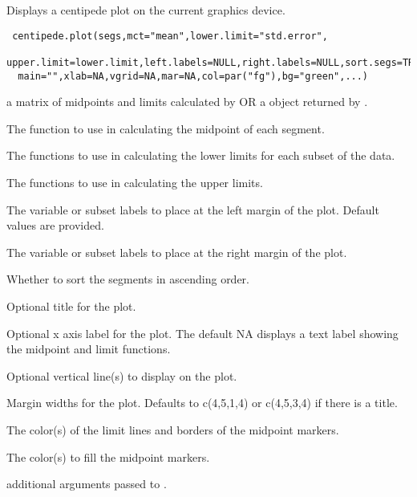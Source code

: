 \begin{Description}\relax
Displays a centipede plot on the current graphics device.
\end{Description}
\begin{Usage}
\begin{verbatim}
 centipede.plot(segs,mct="mean",lower.limit="std.error",
  upper.limit=lower.limit,left.labels=NULL,right.labels=NULL,sort.segs=TRUE,
  main="",xlab=NA,vgrid=NA,mar=NA,col=par("fg"),bg="green",...)
\end{verbatim}
\end{Usage}
\begin{Arguments}
\begin{ldescription}
\item[\code{segs}] a matrix of midpoints and limits calculated by
 OR a  object returned by
.
\item[\code{mct}] The function to use in calculating the midpoint of each
segment.
\item[\code{lower.limit}] The functions to use in calculating the
lower limits for each subset of the data.
\item[\code{upper.limit}] The functions to use in calculating the
upper limits.
\item[\code{left.labels}] The variable or subset labels to place 
at the left margin of the plot. Default values are provided.
\item[\code{right.labels}] The variable or subset labels to place 
at the right margin of the plot.
\item[\code{sort.segs}] Whether to sort the segments in ascending order.
\item[\code{main}] Optional title for the plot.
\item[\code{xlab}] Optional x axis label for the plot. The default NA
displays a text label showing the midpoint and limit functions.
\item[\code{vgrid}] Optional vertical line(s) to display on the plot.
\item[\code{mar}] Margin widths for the plot. Defaults to c(4,5,1,4) or 
c(4,5,3,4) if there is a title.
\item[\code{col}] The color(s) of the limit lines and borders of the midpoint
markers.
\item[\code{bg}] The color(s) to fill the midpoint markers.
\item[\code{...}] additional arguments passed to .
\end{ldescription}
\end{Arguments}
